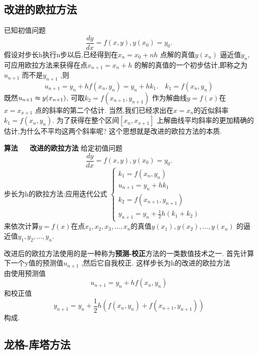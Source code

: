 \subsection{改进的欧拉方法}
已知初值问题
\begin{equation}
  \frac{dy}{dx}=f(x,y),y(x_0)=y_0.
\end{equation}
假设对步长h执行n步以后,已经得到在$x_n=x_0+nh$ 点解的真值$y(x_n)$ 逼近值$y_n$, 可应用欧拉方法来获得在点$x_{n+1}=x_n+h$ 的解的真值的一个初步估计,即称之为$u_{n+1}$ 而不是$y_{n+1}$ ,则
\begin{equation}
  u_{n+1}=y_n+hf(x_n,y_n)=y_n+hk_1. \quad k_1=f(x_n,y_n)
\end{equation}
既然$u_{n+1}\thickapprox y(x_{n+1})$, 可取$k_2=f(x_{n+1},y_{n+1})$ 作为解曲线$y=f(x)$在$x=x_{x+1}$ 点的斜率的第二个估计. \newline
当然,我们已经求出在$x=x_n$的近似斜率$k_1=f(x_n,y_n)$. 为了获得在整个区间$[x_n,x_{x+1}]$ 上解曲线平均斜率的更加精确的估计,为什么不平均这两个斜率呢? \newline 这个思想就是改进的欧拉方法的本质.
\begin{theorem}
  {\bf 算法~~~改进的欧拉方法} \newline
给定初值问题
\begin{equation}
  \frac{dy}{dx}=f(x,y),y(x_0)=y_0.
\end{equation}
步长为h的欧拉方法:应用迭代公式
$
\begin{cases}
  k_1=f(x_n,y_n) \\
  u_{n+1}=y_n+hk_1 \\
  k_2=f(x_{n+1},y_{n+1}) \\
  y_{n+1}=y_n+\frac{1}{2}h(k_1+k_2)
\end{cases}
$
\\
来依次计算$y=f(x)$在点$x_1,x_2,x_3,\ldots,x_n$的真值$y(x_1),y(x_2),\ldots,y(x_n)$ 的逼近值$y_1,y_2,\ldots,y_n$. 
\end{theorem}
\begin{note}
  改进后的欧拉方法使用的是一种称为{\bf 预测-校正}方法的一类数值技术之一. 首先计算下一个y值的预测值$u_{n+1}$ ,然后它自我校正. 这样步长为h的改进的欧拉方法\\
  由使用预测值
  \begin{equation}
    u_{n+1}=y_n+hf(x_n,y_n)
  \end{equation}
  和校正值
  \begin{equation}
    y_{n+1}=y_n+\frac{1}{2}h(f(x_n,y_n)+f(x_{n+1},y_{n+1}))
  \end{equation}
  构成.
\end{note}

\subsection{龙格-库塔方法}

